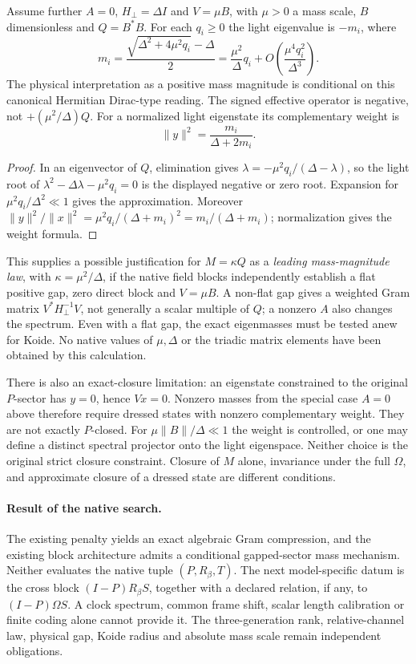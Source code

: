 \begin{proposition}
\label{v480:native-flat-gap-mass}
Assume further $A=0$, $H_\perp=\Delta I$ and $V=\mu B$, with
$\mu>0$ a mass scale, $B$ dimensionless and $Q=B^*B$.
For each $q_i\geq0$ the light eigenvalue is $-m_i$, where
\[
 m_i=\frac{\sqrt{\Delta^2+4\mu^2q_i}-\Delta}{2}
     =\frac{\mu^2}{\Delta}q_i
       +O\!\left(\frac{\mu^4q_i^2}{\Delta^3}\right).
\]
The physical interpretation as a positive mass magnitude is conditional
on this canonical Hermitian Dirac-type reading. The signed effective
operator is negative, not $+(\mu^2/\Delta)Q$. For a normalized light
eigenstate its complementary weight is
\[
 \|y\|^2=\frac{m_i}{\Delta+2m_i}.
\]
\end{proposition}
\begin{proof}
In an eigenvector of $Q$, elimination gives
$\lambda=-\mu^2q_i/(\Delta-\lambda)$, so the light root of
$\lambda^2-\Delta\lambda-\mu^2q_i=0$ is the displayed negative
or zero root. Expansion for $\mu^2q_i/\Delta^2\ll1$ gives the approximation.
Moreover $\|y\|^2/\|x\|^2=\mu^2q_i/(\Delta+m_i)^2
=m_i/(\Delta+m_i)$; normalization gives the weight formula.
\end{proof}

This supplies a possible justification for $M=\kappa Q$ as a
\emph{leading mass-magnitude law}, with $\kappa=\mu^2/\Delta$,
if the native field blocks independently establish a flat positive
gap, zero direct block and $V=\mu B$. A non-flat gap gives a
weighted Gram matrix $V^*H_\perp^{-1}V$, not generally a scalar
multiple of $Q$; a nonzero $A$ also changes the spectrum. Even with
a flat gap, the exact eigenmasses must be tested anew for Koide.
No native values of $\mu,\Delta$ or the triadic matrix elements
have been obtained by this calculation.

There is also an exact-closure limitation: an eigenstate constrained
to the original $P$-sector has $y=0$, hence $Vx=0$. Nonzero masses
from the special case $A=0$ above therefore require dressed states
with nonzero complementary weight. They are not exactly $P$-closed.
For $\mu\|B\|/\Delta\ll1$ the weight is controlled, or one may define
a distinct spectral projector onto the light eigenspace. Neither
choice is the original strict closure constraint. Closure of $M$
alone, invariance under the full $\Omega$, and approximate closure
of a dressed state are different conditions.

\paragraph{Result of the native search.}
The existing penalty yields an exact algebraic Gram compression, and
the existing block architecture admits a conditional gapped-sector
mass mechanism. Neither evaluates the native tuple $(P,R_\beta,T)$.
The next model-specific datum is the cross block
$(I-P)R_\beta S$, together with a declared relation, if any, to
$(I-P)\Omega S$. A clock spectrum, common frame shift, scalar
length calibration or finite coding alone cannot provide it. The
three-generation rank, relative-channel law, physical gap, Koide
radius and absolute mass scale remain independent obligations.
